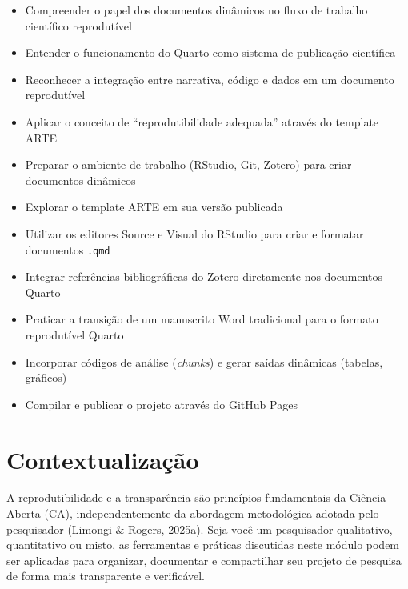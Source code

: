 \documentclass[
  a4paper,
]{book}
\providecommand{\tightlist}{%
  \setlength{\itemsep}{0pt}\setlength{\parskip}{0pt}}\usepackage{longtable,booktabs,array}
\newcommand{\emojitext}[1]{{\emoji #1}}
\begin{document}
\begin{tcolorbox}[enhanced jigsaw, colback=white, toptitle=1mm, opacityback=0, left=2mm, rightrule=.15mm, title={\emojitext{🎯} Ao final deste módulo, você será capaz de:}, coltitle=black, opacitybacktitle=0.6, breakable, toprule=.15mm, bottomtitle=1mm, titlerule=0mm, bottomrule=.15mm, arc=.35mm, leftrule=.75mm, colframe=quarto-callout-tip-color-frame, colbacktitle=quarto-callout-tip-color!10!white]

\begin{itemize}
\tightlist
\item
  Compreender o papel dos documentos dinâmicos no fluxo de trabalho
  científico reprodutível
\item
  Entender o funcionamento do Quarto como sistema de publicação
  científica
\item
  Reconhecer a integração entre narrativa, código e dados em um
  documento reprodutível
\item
  Aplicar o conceito de ``reprodutibilidade adequada'' através do
  template ARTE
\item
  Preparar o ambiente de trabalho (RStudio, Git, Zotero) para criar
  documentos dinâmicos
\item
  Explorar o template ARTE em sua versão publicada
\item
  Utilizar os editores Source e Visual do RStudio para criar e formatar
  documentos \texttt{.qmd}
\item
  Integrar referências bibliográficas do Zotero diretamente nos
  documentos Quarto
\item
  Praticar a transição de um manuscrito Word tradicional para o formato
  reprodutível Quarto
\item
  Incorporar códigos de análise (\emph{chunks}) e gerar saídas dinâmicas
  (tabelas, gráficos)
\item
  Compilar e publicar o projeto através do GitHub Pages
\end{itemize}

\end{tcolorbox}

\section{Contextualização}\label{contextualizauxe7uxe3o-5}

A reprodutibilidade e a transparência são princípios fundamentais da
Ciência Aberta (CA), independentemente da abordagem metodológica adotada
pelo pesquisador (Limongi \& Rogers, 2025a). Seja você um pesquisador
qualitativo, quantitativo ou misto, as ferramentas e práticas discutidas
neste módulo podem ser aplicadas para organizar, documentar e
compartilhar seu projeto de pesquisa de forma mais transparente e
verificável.
\end{document}
